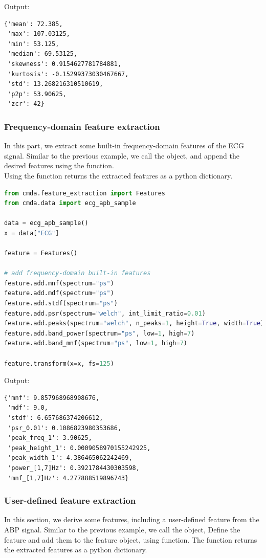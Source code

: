\documentclass{article}
\begin{document}
Output:
\begin{lstlisting}[caption=Time-domain feature extraction output]
{'mean': 72.385,
 'max': 107.03125,
 'min': 53.125,
 'median': 69.53125,
 'skewness': 0.9154627781784881,
 'kurtosis': -0.15299373030467667,
 'std': 13.268216310510619,
 'p2p': 53.90625,
 'zcr': 42}
\end{lstlisting}

\subsubsection{Frequency-domain feature extraction}
In this part, we extract some built-in frequency-domain features of the ECG signal. Similar to the previous example, we call the  object, and append the desired features using the  function.\\
Using the  function returns the extracted features as a python dictionary.
\begin{lstlisting}[language=Python, caption=Frequency-domain feature extraction]
from cmda.feature_extraction import Features
from cmda.data import ecg_apb_sample

data = ecg_apb_sample()
x = data["ECG"]

feature = Features()

# add frequency-domain built-in features
feature.add.mnf(spectrum="ps")
feature.add.mdf(spectrum="ps")
feature.add.stdf(spectrum="ps")
feature.add.psr(spectrum="welch", int_limit_ratio=0.01)
feature.add.peaks(spectrum="welch", n_peaks=1, height=True, width=True)
feature.add.band_power(spectrum="ps", low=1, high=7)
feature.add.band_mnf(spectrum="ps", low=1, high=7)

feature.transform(x=x, fs=125)
\end{lstlisting}

Output:
\begin{lstlisting}[caption=Frequency-domain feature extraction output]
{'mnf': 9.857968968908676,
 'mdf': 9.0,
 'stdf': 6.657686374206612,
 'psr_0.01': 0.1086823980353686,
 'peak_freq_1': 3.90625,
 'peak_height_1': 0.0009058970155242925,
 'peak_width_1': 4.386465062242469,
 'power_[1,7]Hz': 0.3921784430303598,
 'mnf_[1,7]Hz': 4.277888519896743}
\end{lstlisting}

\subsubsection{User-defined feature extraction}
In this section, we derive some features, including a user-defined feature from the ABP signal. Similar to the previous example, we call the  object, Define the feature and add them to the feature object, using  function. The  function returns the extracted features as a python dictionary.
\end{document}
